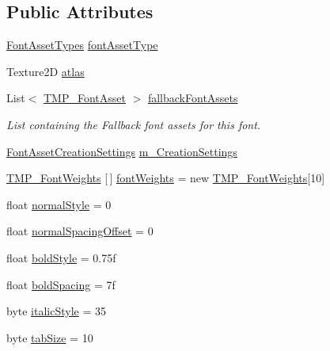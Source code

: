 \subsection*{Public Attributes}
\begin{DoxyCompactItemize}
\item 
\mbox{\hyperlink{class_t_m_pro_1_1_t_m_p___font_asset_a91155d493809b47bc2a9d38ffe43fca3}{Font\+Asset\+Types}} \mbox{\hyperlink{class_t_m_pro_1_1_t_m_p___font_asset_a288bea1979080ff0e8e1e2a6e47545dd}{font\+Asset\+Type}}
\item 
Texture2D \mbox{\hyperlink{class_t_m_pro_1_1_t_m_p___font_asset_a498534bae36d4dd9080e7ac93af657e0}{atlas}}
\item 
List$<$ \mbox{\hyperlink{class_t_m_pro_1_1_t_m_p___font_asset}{T\+M\+P\+\_\+\+Font\+Asset}} $>$ \mbox{\hyperlink{class_t_m_pro_1_1_t_m_p___font_asset_acb4defd1335d404d2e984bd130c59fe1}{fallback\+Font\+Assets}}
\begin{DoxyCompactList}\small\item\em List containing the Fallback font assets for this font. \end{DoxyCompactList}\item 
\mbox{\hyperlink{struct_t_m_pro_1_1_font_asset_creation_settings}{Font\+Asset\+Creation\+Settings}} \mbox{\hyperlink{class_t_m_pro_1_1_t_m_p___font_asset_ad72d9e519e1952c8b9353ab1f951407a}{m\+\_\+\+Creation\+Settings}}
\item 
\mbox{\hyperlink{struct_t_m_pro_1_1_t_m_p___font_weights}{T\+M\+P\+\_\+\+Font\+Weights}} \mbox{[}$\,$\mbox{]} \mbox{\hyperlink{class_t_m_pro_1_1_t_m_p___font_asset_a9cd99822d0d3553f7e21dfa6a4cba2b0}{font\+Weights}} = new \mbox{\hyperlink{struct_t_m_pro_1_1_t_m_p___font_weights}{T\+M\+P\+\_\+\+Font\+Weights}}\mbox{[}10\mbox{]}
\item 
float \mbox{\hyperlink{class_t_m_pro_1_1_t_m_p___font_asset_a5e537de3b95199926e373e61b27fc197}{normal\+Style}} = 0
\item 
float \mbox{\hyperlink{class_t_m_pro_1_1_t_m_p___font_asset_ae58293c90d5a5e0de8545dd9da02e369}{normal\+Spacing\+Offset}} = 0
\item 
float \mbox{\hyperlink{class_t_m_pro_1_1_t_m_p___font_asset_a16dbe5f4d6f79766b9cd9745c94bbc9c}{bold\+Style}} = 0.\+75f
\item 
float \mbox{\hyperlink{class_t_m_pro_1_1_t_m_p___font_asset_a0a4fbd91f8b10c17a222c4b56a586c50}{bold\+Spacing}} = 7f
\item 
byte \mbox{\hyperlink{class_t_m_pro_1_1_t_m_p___font_asset_aa444303f26f16cd2435a4dee25b9f9d5}{italic\+Style}} = 35
\item 
byte \mbox{\hyperlink{class_t_m_pro_1_1_t_m_p___font_asset_ac1e563b82e8b03679c9c1c21f2eaf579}{tab\+Size}} = 10
\end{DoxyCompactItemize}

